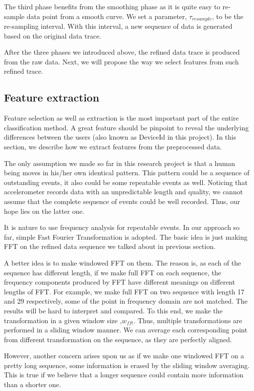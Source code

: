 \documentclass{article} %
\begin{document}
The third phase benefits from the smoothing phase as it is quite easy to re-sample data point from a smooth curve. We set a parameter, $\tau_{resample}$, to be the re-sampling interval. With this interval, a new sequence of data is generated based on the original data trace.

After the three phases we introduced above, the refined data trace is produced from the raw data. Next, we will propose the way we select features from such refined trace.

\subsection{Feature extraction}
Feature selection as well as extraction is the most important part of the entire classification method. A great feature should be pinpoint to reveal the underlying differences between the users (also known as DeviceId in this project). In this section, we describe how we extract features from the preprocessed data.

The only assumption we made so far in this research project is that a human being moves in his/her own identical pattern. This pattern could be a sequence of outstanding events, it also could be some repeatable events as well. Noticing that accelerometer records data with an unpredictable length and quality, we cannot assume that the complete sequence of events could be well recorded. Thus, our hope lies on the latter one. 

It is nature to use frequency analysis for repeatable events. In our approach so far, simple Fast Fourier Transformation is adopted. The basic idea is just making FFT on the refined data sequence we talked about in previous section.

A better idea is to make windowed FFT on them. The reason is, as each of the sequence has different length, if we make full FFT on each sequence, the frequency components produced by FFT have different meanings on different lengths of FFT. For example, we make full FFT on two sequence with length 17 and 29 respectively, some of the point in frequency domain are not matched. The results will be hard to interpret and compared. To this end, we make the transformation in a given window size ,$w_{fft}$. Thus, multiple transformations are performed in a sliding window manner. We can average each corresponding point from different transformation on the sequence, as they are perfectly aligned. 

However, another concern arises upon us as if we make one windowed FFT on a pretty long sequence, some information is erased by the sliding window averaging. This is true if we believe that a longer sequence could contain more information than a shorter one.
\end{document}
